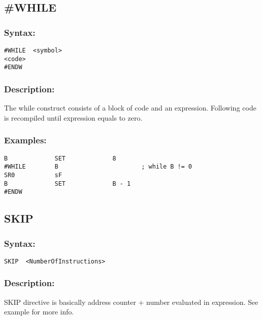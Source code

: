    \subsection{\#WHILE}
        \subsubsection{Syntax:}
            {
                \usecodefont
                \verb'#WHILE  <symbol>'\\
                \verb'<code>'\\
                \verb'#ENDW'
            }

        \subsubsection{Description:}
            The while construct consists of a block of code and an expression. Following code is recompiled until expression equals to zero.

        \subsubsection{Examples:}
            {
                \usecodefont
                \verb'B             SET             8'\\
                \verb'#WHILE        B                       ; while B != 0'\\
                \verb'SR0           sF'\\
                \verb'B             SET             B - 1'\\
                \verb'#ENDW'
            }

    \subsection{SKIP}
        \subsubsection{Syntax:}
            {
                \usecodefont
                \verb'SKIP  <NumberOfInstructions>'
            }

        \subsubsection{Description:}
            SKIP directive is basically address counter + number evaluated in expression. See example for more info.

